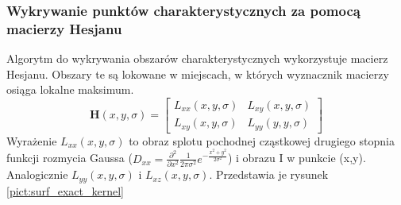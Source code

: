 \subsubsection{Wykrywanie punktów charakterystycznych za pomocą macierzy Hesjanu}
Algorytm do wykrywania obszarów charakterystycznych wykorzystuje macierz Hesjanu. Obszary te są lokowane w miejscach, w których wyznacznik macierzy osiąga lokalne maksimum.
\begin{equation}
\textbf{H}(x,y,\sigma) = 
\left[\begin{array}{cc}
L_{xx}(x,y,\sigma)&L_{xy}(x,y,\sigma)\\
L_{xy}(x,y,\sigma)&L_{yy}(y,y,\sigma)
\end{array}\right]
\end{equation}
Wyrażenie $L_{xx}(x,y,\sigma)$ to obraz splotu pochodnej cząstkowej drugiego stopnia funkcji rozmycia Gaussa ($D_{xx}=\frac{\partial^2}{\partial x^2}\frac{1}{2\pi\sigma^2}e^{-\frac{x^2+y^2}{2\sigma^2}}$) i obrazu I w punkcie (x,y). Analogicznie $L_{yy}(x,y,\sigma)$ i $L_{xz}(x,y,\sigma)$. Przedstawia je rysunek \ref{pict:surf_exact_kernel}

